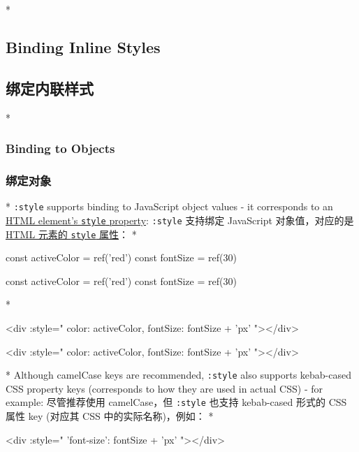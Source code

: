 \begin{paracol}{2}

\switchcolumn[0]*%
\subsection{Binding Inline Styles}
\switchcolumn
\subsection{绑定内联样式}
\switchcolumn[0]*%
\subsubsection{Binding to Objects}
\switchcolumn
\subsubsection{绑定对象}
\switchcolumn[0]*%
\texttt{:style} supports binding to JavaScript object values - it
corresponds to an
\href{https://developer.mozilla.org/en-US/docs/Web/API/HTMLElement/style}{HTML
element's \texttt{style} property}:
\switchcolumn
\texttt{:style} 支持绑定 JavaScript 对象值，对应的是
\href{https://developer.mozilla.org/en-US/docs/Web/API/HTMLElement/style}{HTML
元素的 \texttt{style} 属性}：
\switchcolumn[0]*%
\begin{codeJs}
const activeColor = ref('red')
const fontSize = ref(30)
\end{codeJs}
\switchcolumn
\begin{codeJs}
const activeColor = ref('red')
const fontSize = ref(30)
\end{codeJs}
\switchcolumn[0]*%
\begin{codeHtml}
<div :style="{ color: activeColor, fontSize: fontSize + 'px' }"></div>
\end{codeHtml}
\switchcolumn
\begin{codeHtml}
<div :style="{ color: activeColor, fontSize: fontSize + 'px' }"></div>
\end{codeHtml}
\switchcolumn[0]*%
Although camelCase keys are recommended, \texttt{:style} also supports
kebab-cased CSS property keys (corresponds to how they are used in
actual CSS) - for example:
\switchcolumn
尽管推荐使用 camelCase，但 \texttt{:style} 也支持 kebab-cased 形式的 CSS
属性 key (对应其 CSS 中的实际名称)，例如：
\switchcolumn[0]*%
\begin{codeHtml}
<div :style="{ 'font-size': fontSize + 'px' }"></div>
\end{codeHtml}

\end{paracol}
